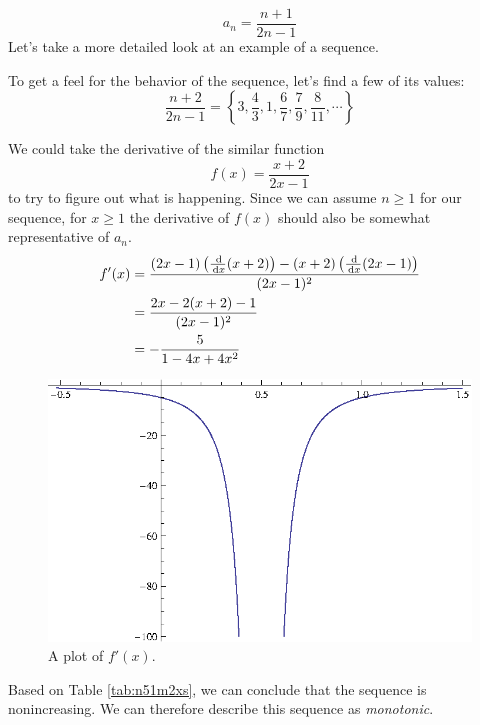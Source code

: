 \begin{ex}\label{ex:bigsequence}
  \[ a_n=\frac{n+1}{2n-1} \]
    Let's take a more detailed look at an example of a sequence.

    To get a feel for the behavior of the sequence, let's find a few of its
    values:
    \[ \frac{n+2}{2n-1} =
      \left\{3,\frac{4}{3},1,\frac{6}{7},\frac{7}{9},\frac{8}{11}, \cdots \right\} \]


    We could take the derivative of the similar function
    \[ f(x)=\frac{x+2}{2x-1} \]
    to try to figure out what is happening. Since we can assume \(n \geq 1\) for
    our sequence, for \(x \geq 1\) the derivative of \(f(x)\) should also be
    somewhat representative of \(a_n\).
    \begin{align*}
      f'(x)&= \frac{(2 x-1) \left(\frac{\,\mathrm{d}}{\,\mathrm{d} x}(x+2)\right)-(x+2)
      \left(\frac{\,\mathrm{d}}{\,\mathrm{d} x}(2 x-1)\right)}{(2 x-1)^2}
      \\
      &=\frac{2 x-2 (x+2)-1}{(2 x-1)^2} \\
      &=-\frac{5}{1-4 x+4 x^2}
    \end{align*}
    \begin{table}[h]
      \centering
      \caption{A sign diagram for \(f'(x)\).}
      \label{tab:n51m2xs}
    \end{table}
    \begin{figure}[h]
      \begin{center}
        \includegraphics{graphs/n51m2xs.eps}
      \end{center}
      \caption{A plot of \(f'(x)\).}
      \label{fig:n51m2xs}
    \end{figure}
    Based on Table \ref{tab:n51m2xs}, we can conclude that the sequence is
    nonincreasing. We can therefore describe this sequence as \emph{monotonic}.


\end{ex}

